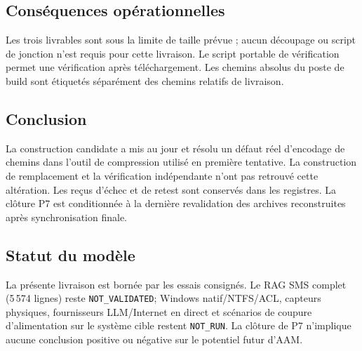 \documentclass[11pt,a4paper]{article}
\begin{document}
\subsection{Conséquences opérationnelles}
Les trois livrables sont sous la limite de taille prévue ; aucun découpage ou script de jonction n'est requis pour cette livraison. Le script portable de vérification permet une vérification après téléchargement. Les chemins absolus du poste de build sont étiquetés séparément des chemins relatifs de livraison.

\subsection{Conclusion}
La construction candidate a mis au jour et résolu un défaut réel d'encodage de chemins dans l'outil de compression utilisé en première tentative. La construction de remplacement et la vérification indépendante n'ont pas retrouvé cette altération. Les reçus d'échec et de retest sont conservés dans les registres. La clôture P7 est conditionnée à la dernière revalidation des archives reconstruites après synchronisation finale.

\subsection{Statut du modèle}
La présente livraison est bornée par les essais consignés. Le RAG SMS complet (5\,574 lignes) reste \texttt{NOT\_VALIDATED}; Windows natif/NTFS/ACL, capteurs physiques, fournisseurs LLM/Internet en direct et scénarios de coupure d'alimentation sur le système cible restent \texttt{NOT\_RUN}. La clôture de P7 n'implique aucune conclusion positive ou négative sur le potentiel futur d'AAM.
\end{document}
